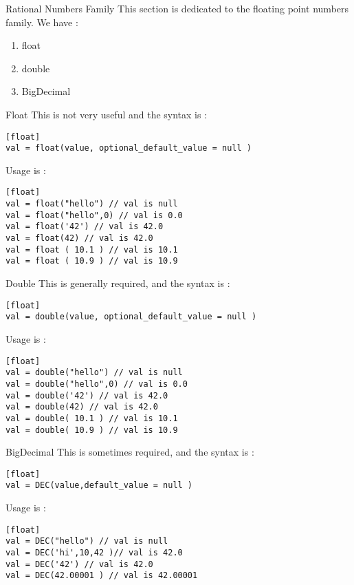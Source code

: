 \begin{section}{Rational Numbers Family}
This section is dedicated to the floating point numbers family.
We have :
\begin{enumerate}
\item{float}
\item{double}
\item{BigDecimal}
\end{enumerate}

\begin{subsection}{Float}
This is not very useful and the syntax is :

\begin{lstlisting}[style=JexlStyle][float]
val = float(value, optional_default_value = null )
\end{lstlisting}

Usage is :

\begin{lstlisting}[style=JexlStyle][float]
val = float("hello") // val is null
val = float("hello",0) // val is 0.0
val = float('42') // val is 42.0 
val = float(42) // val is 42.0 
val = float ( 10.1 ) // val is 10.1 
val = float ( 10.9 ) // val is 10.9 
\end{lstlisting}

\end{subsection}


\begin{subsection}{Double}
This is generally required, and the syntax is :

\begin{lstlisting}[style=JexlStyle][float]
val = double(value, optional_default_value = null )
\end{lstlisting}

Usage is :

\begin{lstlisting}[style=JexlStyle][float]
val = double("hello") // val is null
val = double("hello",0) // val is 0.0
val = double('42') // val is 42.0 
val = double(42) // val is 42.0 
val = double( 10.1 ) // val is 10.1 
val = double( 10.9 ) // val is 10.9 
\end{lstlisting}

\end{subsection}

\begin{subsection}{BigDecimal}
This is sometimes required, and the syntax is :

\begin{lstlisting}[style=JexlStyle][float]
val = DEC(value,default_value = null )
\end{lstlisting}

Usage is :

\begin{lstlisting}[style=JexlStyle][float]
val = DEC("hello") // val is null
val = DEC('hi',10,42 )// val is 42.0
val = DEC('42') // val is 42.0 
val = DEC(42.00001 ) // val is 42.00001
\end{lstlisting}

\end{subsection}

\end{section}


